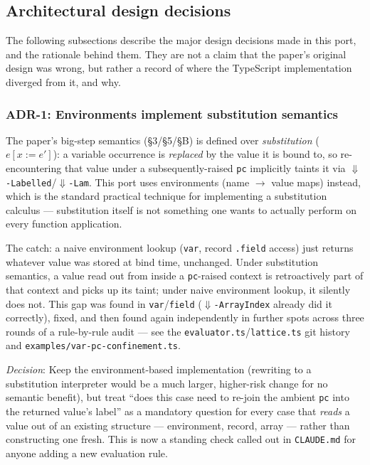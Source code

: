 \documentclass[11pt, a4paper]{article}
\begin{document}
\subsection{Architectural design decisions}

The following subsections describe the major design decisions made in this
port, and the rationale behind them. They are not a claim that the paper's
original design was wrong, but rather a record of where the TypeScript
implementation diverged from it, and why.

\subsubsection{ADR-1: Environments implement substitution semantics}
\label{sec:env-not-subst}

The paper's big-step semantics (§3/§5/§B) is defined over \emph{substitution}
($e[x := e']$): a variable occurrence is \emph{replaced} by the value it is
bound to, so re-encountering that value under a subsequently-raised \texttt{pc}
implicitly taints it via
\texttt{$\Downarrow$-Labelled}/\texttt{$\Downarrow$-Lam}. This port uses
environments (name $\to$ value maps) instead, which is the standard practical
technique for implementing a substitution calculus --- substitution itself is
not something one wants to actually perform on every function application.

The catch: a naive environment lookup (\texttt{var}, record \texttt{.field}
access) just returns whatever value was stored at bind time, unchanged. Under
substitution semantics, a value read out from inside a \texttt{pc}-raised
context is retroactively part of that context and picks up its taint; under
naive environment lookup, it silently does not. This gap was found in
\texttt{var}/\texttt{field} (\texttt{$\Downarrow$-ArrayIndex} already did it
correctly), fixed, and then found again independently in further spots across
three rounds of a rule-by-rule audit --- see the
\texttt{evaluator.ts}/\texttt{lattice.ts} git history and
\texttt{examples/var-pc-confinement.ts}.

\emph{Decision}: Keep the environment-based implementation (rewriting to a
substitution interpreter would be a much larger, higher-risk change for no
semantic benefit), but treat ``does this case need to re-join the ambient
\texttt{pc} into the returned value's label'' as a mandatory question for every
case that \emph{reads} a value out of an existing structure --- environment,
record, array --- rather than constructing one fresh. This is now a standing
check called out in \texttt{CLAUDE.md} for anyone adding a new evaluation rule.
\end{document}
